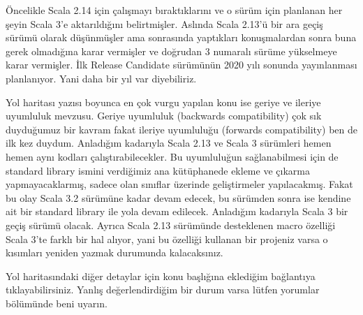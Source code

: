 \documentclass[11pt]{article}
\begin{document}
Öncelikle Scala 2.14 için çalışmayı bıraktıklarını ve o sürüm için planlanan
her şeyin Scala 3'e aktarıldığını belirtmişler. Aslında Scala 2.13'ü bir ara
geçiş sürümü olarak düşünmüşler ama sonrasında yaptıkları konuşmalardan sonra
buna gerek olmadığına karar vermişler ve doğrudan 3 numaralı sürüme yükselmeye
karar vermişler. İlk Release Candidate sürümünün 2020 yılı sonunda yayınlanması
planlanıyor. Yani daha bir yıl var diyebiliriz.

Yol haritası yazısı boyunca en çok vurgu yapılan konu ise geriye ve ileriye
uyumluluk mevzusu. Geriye uyumluluk (backwards compatibility) çok sık
duyduğumuz bir kavram fakat ileriye uyumluluğu (forwards compatibility) ben de
ilk kez duydum. Anladığım kadarıyla Scala 2.13 ve Scala 3 sürümleri hemen hemen
aynı kodları çalıştırabilecekler. Bu uyumluluğun sağlanabilmesi için de
standard library ismini verdiğimiz ana kütüphanede ekleme ve çıkarma
yapmayacaklarmış, sadece olan sınıflar üzerinde geliştirmeler yapılacakmış.
Fakat bu olay Scala 3.2 sürümüne kadar devam edecek, bu sürümden sonra ise
kendine ait bir standard library ile yola devam edilecek. Anladığım kadarıyla
Scala 3 bir geçiş sürümü olacak. Ayrıca Scala 2.13 sürümünde desteklenen macro
özelliği Scala 3'te farklı bir hal alıyor, yani bu özelliği kullanan bir
projeniz varsa o kısımları yeniden yazmak durumunda kalacaksınız.

Yol haritasındaki diğer detaylar için konu başlığına eklediğim bağlantıya
tıklayabilirsiniz. Yanlış değerlendirdiğim bir durum varsa lütfen yorumlar
bölümünde beni uyarın.
\end{document}
